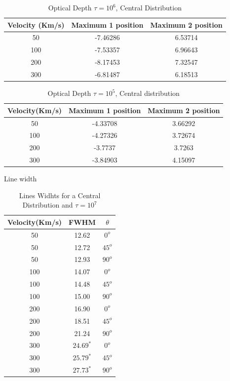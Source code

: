 \documentclass{article}
\theoremstyle{definition}
\theoremstyle{remark}
\begin{document}
\begin{table}[H]
\begin{center}
\begin{tabular}{|c|c|c|}
\hline 
Velocity (Km/s) & Maximum 1 position & Maximum 2 position\\ 
\hline 
50 & -7.46286 & 6.53714 \\ 
\hline 
100 & -7.53357 & 6.96643 \\ 
\hline 
200 & -8.17453 & 7.32547 \\ 
\hline 
300 & -6.81487 & 6.18513 \\ 
\hline 
\end{tabular} 
\end{center}
\caption{Optical Depth $\tau = 10^{6}$, Central Distribution}
\end{table}

\begin{table}[H]
\begin{center}
\begin{tabular}{|c|c|c|}
\hline 
Velocity(Km/s) & Maximum 1 position & Maximum 2 position\\ 
\hline 
50 & -4.33708 & 3.66292 \\ 
\hline 
100 & -4.27326 & 3.72674 \\ 
\hline 
200 & -3.7737 & 3.7263   \\ 
\hline 
300 & -3.84903 & 4.15097 \\ 
\hline 
\end{tabular}
\caption{Optical Depth $\tau=10^{5}$, Central distribution} 
\end{center}
\end{table}

Line width\\

\begin{table}[H]
\begin{center}
\begin{tabular}{|c|c|c|}
\hline 
Velocity(Km/s) & FWHM & $\theta$\\ 
\hline 
50 & 12.62 & $0^{o}$ \\ 
\hline 
50 & 12.72 & $45^{o}$ \\ 
\hline 
50 & 12.93 & $90^{o}$ \\ 
\hline 
100 & 14.07 & $0^{o}$ \\ 
\hline
100 & 14.48 & $45^{o}$ \\ 
\hline 
100 & 15.00 & $90^{o}$ \\ 
\hline 
200 & 16.90 & $0^{o}$  \\ 
\hline 
200 & 18.51 & $45^{o}$ \\ 
\hline 
200 & 21.24 & $90^{o}$ \\ 
\hline 
300 & $24.69^{*}$ & $0^{o}$ \\ 
\hline 
300 & $25.79^{*}$ & $45^{o}$  \\ 
\hline  
300 & $27.73^{*}$ & $90^{o}$ \\ 
\hline  
\end{tabular}
\caption{Lines Widhts for a Central Distribution and $\tau=10^{7}$} 
\end{center}
\end{table}
\end{document}
